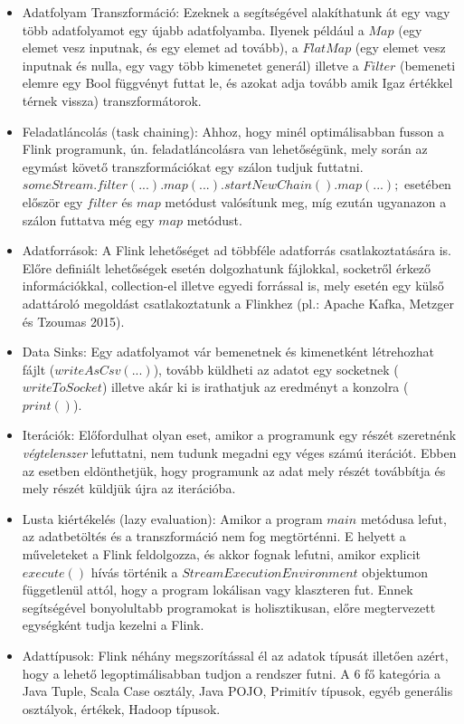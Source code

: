 \documentclass[a4paper,12pt]{article}
\begin{document}
\begin{itemize}
\item Adatfolyam Transzformáció: Ezeknek a segítségével alakíthatunk át egy vagy több adatfolyamot egy újabb adatfolyamba. Ilyenek például a $Map$ (egy elemet vesz inputnak, és egy elemet ad tovább), a $FlatMap$ (egy elemet vesz inputnak és nulla, egy vagy több kimenetet generál) illetve a $Filter$ (bemeneti elemre egy Bool függvényt futtat le, és azokat adja tovább amik Igaz értékkel térnek vissza) transzformátorok.
\item Feladatláncolás (task chaining): Ahhoz, hogy minél optimálisabban fusson a Flink programunk, ún. feladatláncolásra van lehetőségünk, mely során az egymást követő transzformációkat egy szálon tudjuk futtatni. $someStream.filter(...).map(...).startNewChain().map(...);$ esetében először egy $filter$ és $map$ metódust valósítunk meg, míg ezután ugyanazon a szálon futtatva még egy $map$ metódust.
\item Adatforrások: A Flink lehetőséget ad többféle adatforrás csatlakoztatására is. Előre definiált lehetőségek esetén dolgozhatunk fájlokkal, socketről érkező információkkal, collection-el 
illetve egyedi forrással is, mely esetén egy külső adattároló megoldást csatlakoztatunk a Flinkhez (pl.: Apache Kafka, Metzger és Tzoumas 2015).
\item Data Sinks: Egy adatfolyamot vár bemenetnek és kimenetként létrehozhat fájlt ($writeAsCsv(...)$), tovább küldheti az adatot egy socketnek ($writeToSocket$) illetve akár ki is irathatjuk az eredményt a konzolra ($print()$). 
\item Iterációk: Előfordulhat olyan eset, amikor a programunk egy részét szeretnénk \textsl{végtelenszer} lefuttatni, nem tudunk megadni egy véges számú iterációt. Ebben az esetben eldönthetjük, hogy programunk az adat mely részét továbbítja és mely részét küldjük újra az iterációba. 
\item Lusta kiértékelés (lazy evaluation): Amikor a program $main$ metódusa lefut, az adatbetöltés és a transzformáció nem fog megtörténni. E helyett a műveleteket a Flink feldolgozza, és  akkor fognak lefutni, amikor explicit $execute()$ hívás történik a $StreamExecutionEnvironment$ objektumon függetlenül attól, hogy a program lokálisan vagy klaszteren fut. Ennek segítségével bonyolultabb programokat is holisztikusan, előre megtervezett egységként tudja kezelni a Flink.
\item Adattípusok: Flink néhány megszorítással él az adatok típusát illetően azért, hogy a lehető legoptimálisabban tudjon a rendszer futni. A 6 fő kategória a Java Tuple, Scala Case osztály, Java POJO, Primitív típusok, egyéb generális osztályok, értékek, Hadoop típusok.
\end{itemize}
\end{document}
